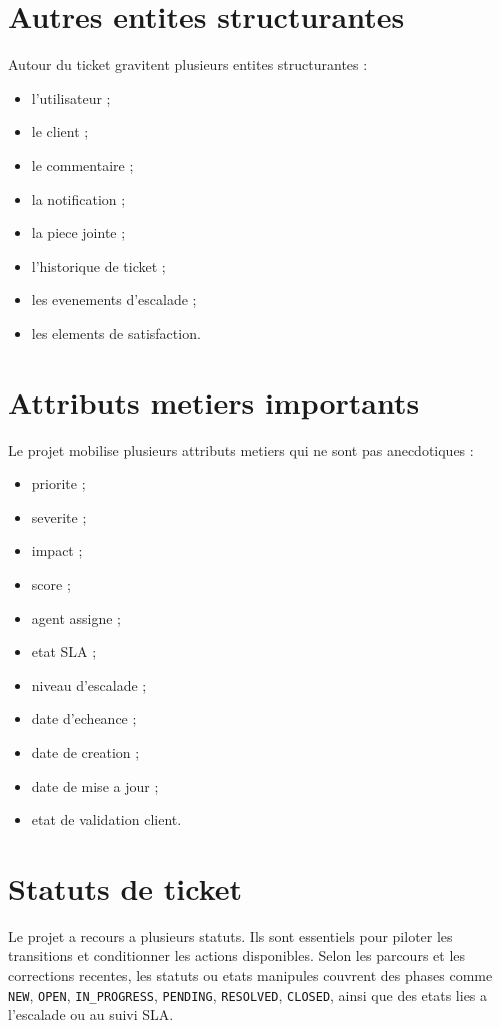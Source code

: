 \documentclass[12pt,a4paper,oneside]{report}
\begin{document}
\section{Autres entites structurantes}

Autour du ticket gravitent plusieurs entites structurantes :

\begin{itemize}[leftmargin=1.2cm]
  \item l'utilisateur ;
  \item le client ;
  \item le commentaire ;
  \item la notification ;
  \item la piece jointe ;
  \item l'historique de ticket ;
  \item les evenements d'escalade ;
  \item les elements de satisfaction.
\end{itemize}

\section{Attributs metiers importants}

Le projet mobilise plusieurs attributs metiers qui ne sont pas anecdotiques :

\begin{itemize}[leftmargin=1.2cm]
  \item priorite ;
  \item severite ;
  \item impact ;
  \item score ;
  \item agent assigne ;
  \item etat SLA ;
  \item niveau d'escalade ;
  \item date d'echeance ;
  \item date de creation ;
  \item date de mise a jour ;
  \item etat de validation client.
\end{itemize}

\section{Statuts de ticket}

Le projet a recours a plusieurs statuts. Ils sont essentiels pour piloter les transitions et conditionner les actions disponibles. Selon les parcours et les corrections recentes, les statuts ou etats manipules couvrent des phases comme \texttt{NEW}, \texttt{OPEN}, \texttt{IN\_PROGRESS}, \texttt{PENDING}, \texttt{RESOLVED}, \texttt{CLOSED}, ainsi que des etats lies a l'escalade ou au suivi SLA.
\end{document}
